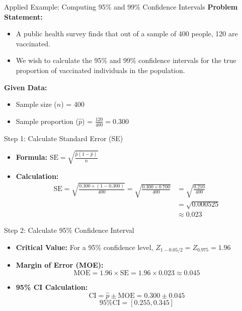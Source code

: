 \documentclass[handout]{beamer} %
\begin{document}
\begin{frame}{Applied Example: Computing 95\% and 99\% Confidence Intervals}
    \textbf{Problem Statement:}
    \begin{itemize}
        \item A public health survey finds that out of a sample of 400 people, 120 are vaccinated.
        \item We wish to calculate the 95\% and 99\% confidence intervals for the true proportion of vaccinated individuals in the population.
    \end{itemize}
    
    \textbf{Given Data:}
    \begin{itemize}
        \item Sample size (\( n \)) = 400
        \item Sample proportion (\( \hat{p} \)) = \(\frac{120}{400} = 0.300\)
    \end{itemize}
\end{frame}

\begin{frame}{Step 1: Calculate Standard Error (SE)}
    \begin{itemize}
        \item \textbf{Formula:} \( \text{SE} = \sqrt{\frac{\hat{p}(1 - \hat{p})}{n}} \)
        \item \textbf{Calculation:}
\begin{align*}
    \text{SE} = \sqrt{\frac{0.300 \times (1 - 0.300)}{400}} = \sqrt{\frac{0.300 \times 0.700}{400}} &= \sqrt{\frac{0.210}{400}}  \\
                                                                                                    &= \sqrt{0.000525} \\
                                                                                                    &\approx 0.023
\end{align*}
        

    \end{itemize}
\end{frame}

\begin{frame}{Step 2: Calculate 95\% Confidence Interval}
    \begin{itemize}
        \item \textbf{Critical Value:} For a 95\% confidence level, \( Z_{1-0.05/2} = Z_{0.975}  = 1.96 \)
        \item \textbf{Margin of Error (MOE):}
        \[
            \text{MOE} = 1.96 \times \text{SE} = 1.96 \times 0.023 \approx 0.045
        \]
        \item \textbf{95\% CI Calculation:}
        \[
            \text{CI} = \hat{p} \pm \text{MOE} = 0.300 \pm 0.045
        \]
        \[
            \text{95\% CI} = [0.255, 0.345]
        \]
    \end{itemize}
\end{frame}
\end{document}
